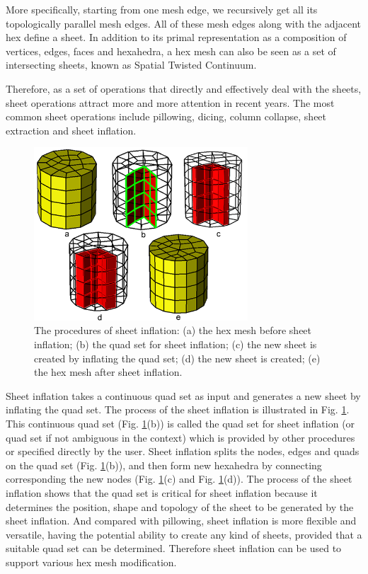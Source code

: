 \documentclass[final,5p,times,twocolumn]{elsarticle}
\begin{document}
More specifically, starting from one mesh edge, we recursively get all its topologically parallel mesh edges. All of these mesh edges along with the adjacent hex define a sheet. In addition to its primal representation as a composition of vertices, edges, faces and hexahedra, a hex mesh can also be seen as a set of intersecting sheets, known as Spatial Twisted Continuum\cite{Murdoch:1997fy}.

Therefore, as a set of operations that directly and effectively deal with the sheets, sheet operations attract more and more attention in recent years. The most common sheet operations include pillowing\cite{Mitchell:1995wa}, dicing\cite{melander1997generation}, column collapse\cite{Staten:2009bo}, sheet extraction\cite{Staten:2009bo,Borden:2002hs} and sheet inflation\cite{Staten:2009bo,Ledoux:2009jz,staten2010sheet}.

\begin{figure}[htbp]
\begin{center}
\includegraphics[width=8cm]{rev_figures/sheet_inflation.png}
\caption{The procedures of sheet inflation: (a) the hex mesh before sheet inflation; (b) the quad set for sheet inflation; (c) the new sheet is created by inflating the quad set; (d) the new sheet is created; (e) the hex mesh after sheet inflation.}
\label{fig:sheet_inflation}
\end{center}
\end{figure}

Sheet inflation takes a continuous quad set as input and generates a new sheet by inflating the quad set. The process of the sheet inflation is illustrated in Fig. \ref{fig:sheet_inflation}. This continuous quad set (Fig. \ref{fig:sheet_inflation}(b)) is called the quad set for sheet inflation (or quad set if not ambiguous in the context) which is provided by other procedures or specified directly by the user. Sheet inflation splits the nodes, edges and quads on the quad set (Fig. \ref{fig:sheet_inflation}(b)), and then form new hexahedra by connecting corresponding the new nodes (Fig. \ref{fig:sheet_inflation}(c) and Fig. \ref{fig:sheet_inflation}(d)). The process of the sheet inflation shows that the quad set is critical for sheet inflation because it determines the position, shape and topology of the sheet to be generated by the sheet inflation. And compared with pillowing, sheet inflation is more flexible and versatile, having the potential ability to create any kind of sheets, provided that a suitable quad set can be determined. Therefore sheet inflation can be used to support various hex mesh modification.
\end{document}
